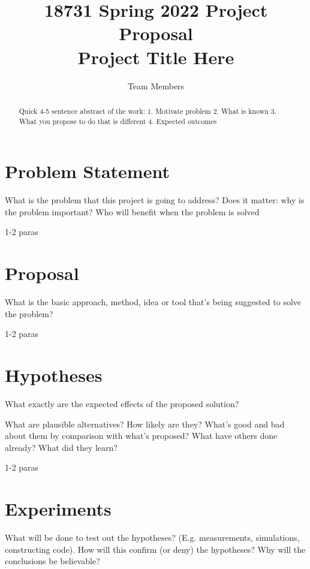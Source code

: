 \documentclass[twocolumn,10pt]{article}
\begin{document}
	\title{18731 Spring 2022 Project Proposal\\ Project Title Here} %
	
\author{
Team Members
  }

\maketitle

\begin{abstract}
Quick 4-5 sentence abstract of the work: 1. Motivate problem 2. What is known 3. What you propose to do that is different 4. Expected outcomes
\end{abstract}


\section{Problem Statement}

What is the problem that this project is going to address?
Does it matter: why is the problem important? Who will
benefit when the problem is solved


1-2 paras


\section{Proposal}

What is the basic approach, method, idea or tool that’s
being suggested to solve the problem?

1-2 paras

\section{Hypotheses}

What exactly are the expected effects of the proposed
solution?


What are plausible alternatives? How likely are they?
What’s good and bad about them by comparison with
what’s proposed? What have others done already? What
did they learn? 


1-2 paras
\section{Experiments}

What will be done to test out the hypotheses? (E.g.
measurements, simulations, constructing code). How will this
confirm (or deny) the hypotheses? Why will the
conclusions be believable?
\end{document}
